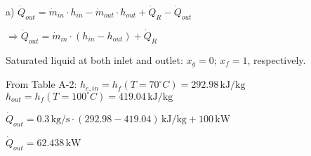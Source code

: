 a) \( \dot{Q}_{out} = \dot{m}_{in} \cdot h_{in} - \dot{m}_{out} \cdot h_{out} + \dot{Q}_R - \dot{Q}_{out} \)  

\( \Rightarrow \dot{Q}_{out} = \dot{m}_{in} \cdot (h_{in} - h_{out}) + \dot{Q}_R \)  

Saturated liquid at both inlet and outlet:  
\( x_g = 0 \); \( x_f = 1 \), respectively.  

From Table A-2:  
\( h_{e,in} = h_f(T = 70^\circ C) = 292.98 \, \text{kJ/kg} \)  
\( h_{out} = h_f(T = 100^\circ C) = 419.04 \, \text{kJ/kg} \)  

\( \dot{Q}_{out} = 0.3 \, \text{kg/s} \cdot (292.98 - 419.04) \, \text{kJ/kg} + 100 \, \text{kW} \)  

\( \dot{Q}_{out} = 62.438 \, \text{kW} \)